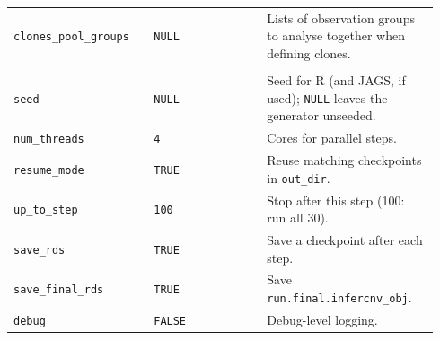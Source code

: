 {\begin{longtable}{@{}>{\raggedright\arraybackslash}p{0.31\linewidth}>{\raggedright\arraybackslash}p{0.25\linewidth}>{\raggedright\arraybackslash}p{0.38\linewidth}@{}}
\texttt{clones\_pool\_groups} & \texttt{NULL} & Lists of observation groups to analyse together when defining clones. \\
\addlinespace
\multicolumn{3}{@{}l}{\textbf{Engineering}}\\
\texttt{seed} & \texttt{NULL} & Seed for R (and JAGS, if used); \texttt{NULL} leaves the generator unseeded. \\
\texttt{num\_threads} & \texttt{4} & Cores for parallel steps. \\
\texttt{resume\_mode} & \texttt{TRUE} & Reuse matching checkpoints in \texttt{out\_dir}. \\
\texttt{up\_to\_step} & \texttt{100} & Stop after this step (100: run all 30). \\
\texttt{save\_rds} & \texttt{TRUE} & Save a checkpoint after each step. \\
\texttt{save\_final\_rds} & \texttt{TRUE} & Save \texttt{run.final.infercnv\_obj}. \\
\texttt{debug} & \texttt{FALSE} & Debug-level logging. \\
\end{longtable}
}
\endgroup
